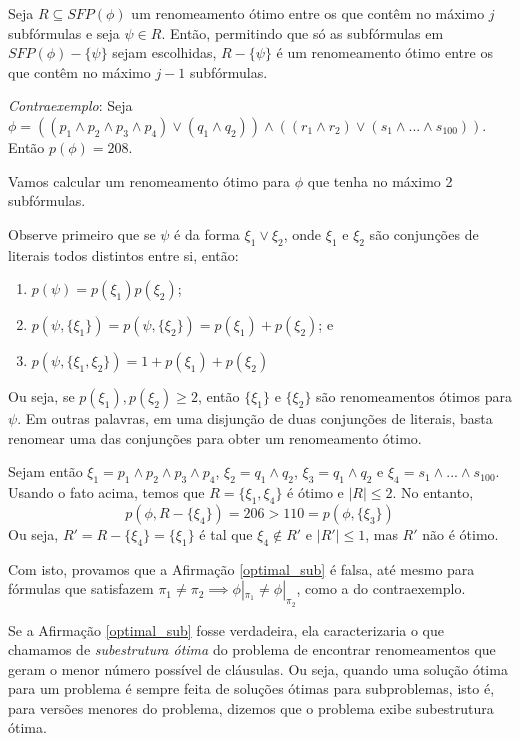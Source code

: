 
\label{cap_algoritmo}

\begin{affirmation}
	\label{optimal_sub}
	Seja $R \subseteq SFP(\phi)$ um renomeamento ótimo entre os que contêm no máximo $j$ subfórmulas e seja $\psi \in R$. Então, permitindo que só as subfórmulas em $SFP(\phi) - \{\psi \}$ sejam escolhidas, $R - \{\psi\}$ é um renomeamento ótimo entre os que contêm no máximo $j-1$ subfórmulas.
\end{affirmation}

\emph{Contraexemplo}: Seja $\phi = ((p_1 \wedge p_2 \wedge p_3 \wedge p_4) \vee (q_1 \wedge q_2)) \wedge ((r_1 \wedge r_2) \vee (s_1 \wedge ... \wedge s_{100}))$. Então $p(\phi) = 208$.

Vamos calcular um renomeamento ótimo para $\phi$ que tenha no máximo 2 subfórmulas.

Observe primeiro que se $\psi$ é da forma $\xi_1 \vee \xi_2$, onde $\xi_1$ e $\xi_2$ são conjunções de literais todos distintos entre si, então:
\begin{enumerate}
	\item $p(\psi) = p(\xi_1)p(\xi_2)$;
	\item $p(\psi, \{\xi_1 \}) = p(\psi, \{\xi_2 \}) = p(\xi_1)+p(\xi_2)$; e
	\item $p(\psi,\{\xi_1,\xi_2 \}) = 1+p(\xi_1)+p(\xi_2)$
\end{enumerate}
Ou seja, se $p(\xi_1),p(\xi_2) \geq 2$, então $\{\xi_1 \}$ e $\{\xi_2 \}$ são renomeamentos ótimos para $\psi$. Em outras palavras, em uma disjunção de duas conjunções de literais, basta renomear uma das conjunções para obter um renomeamento ótimo.

Sejam então $\xi_1 = p_1 \wedge p_2 \wedge p_3 \wedge p_4$, $\xi_2 = q_1 \wedge q_2$, $\xi_3 = q_1 \wedge q_2$ e $\xi_4 = s_1 \wedge ... \wedge s_{100}$. Usando o fato acima, temos que $R = \{\xi_1,\xi_4 \}$ é ótimo e $|R| \leq 2$. No entanto, $$p(\phi,R - \{\xi_4 \}) = 206 > 110 = p(\phi,\{\xi_3 \})$$ Ou seja, $R' = R - \{\xi_4 \} = \{\xi_1 \}$ é tal que $\xi_4 \notin R'$ e $|R'| \leq 1$, mas $R'$ não é ótimo.

Com isto, provamos que a Afirmação \ref{optimal_sub} é falsa, até mesmo para fórmulas que satisfazem $\pi_1 \neq \pi_2 \implies \phi|_{\pi_1} \neq \phi|_{\pi_2}$, como a do contraexemplo.

Se a Afirmação \ref{optimal_sub} fosse verdadeira, ela caracterizaria o que chamamos de \emph{subestrutura ótima} do problema de encontrar renomeamentos que geram o menor número possível de cláusulas. Ou seja, quando uma solução ótima para um problema é sempre feita de soluções ótimas para subproblemas, isto é, para versões menores do problema, dizemos que o problema exibe subestrutura ótima.

